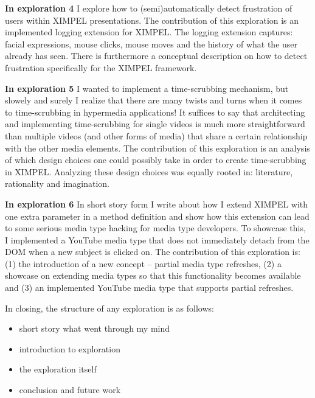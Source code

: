 \textbf{In exploration 4} I explore how to (semi)automatically detect frustration of users within XIMPEL presentations. The contribution of this exploration is an implemented logging extension for XIMPEL. The logging extension captures: facial expressions, mouse clicks, mouse moves and the history of what the user already has seen. There is furthermore a conceptual description on how to detect frustration specifically for the XIMPEL framework.

\textbf{In exploration 5} I wanted to implement a time-scrubbing mechanism, but slowely and surely I realize that there are many twists and turns when it comes to time-scrubbing in hypermedia applications! It suffices to say that architecting and implementing time-scrubbing for single videos is much more straightforward than multiple videos (and other forms of media) that share a certain relationship with the other media elements. The contribution of this exploration is an analysis of which design choices one could possibly take in order to create time-scrubbing in XIMPEL. Analyzing these design choices was equally rooted in: literature, rationality and imagination.

\textbf{In exploration 6} In short story form I write about how I extend XIMPEL with one extra parameter in a method definition and show how this extension can lead to some serious media type hacking for media type developers. To showcase this, I implemented a YouTube media type that does not immediately detach from the DOM when a new subject is clicked on. The contribution of this exploration is: (1) the introduction of a new concept -- partial media type refreshes, (2) a showcase on extending media types so that this functionality becomes available and (3) an implemented YouTube media type that supports partial refreshes.

In closing, the structure of any exploration is as follows:
\begin{itemize}
    \item short story what went through my mind
    \item introduction to exploration
    \item the exploration itself
    \item conclusion and future work
\end{itemize}